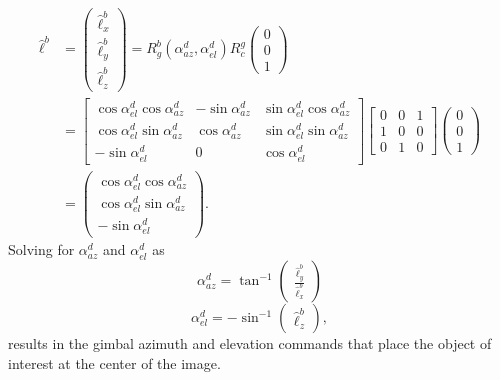 \begin{align}
\hat{\ell}^b&=\begin{pmatrix}
\hat{\ell}_x^b \\
\hat{\ell}_y^b \\
\hat{\ell}_z^b
\end{pmatrix}=R_{g}^b(\alpha_{az}^d, \alpha_{el}^d) R_{c}^g\begin{pmatrix}
0 \\ 0 \\ 1
\end{pmatrix}
\\&=\begin{bmatrix}
\cos\alpha_{el}^d\cos\alpha_{az}^d & -\sin\alpha_{az}^d & \sin\alpha_{el}^d\cos\alpha_{az}^d \\
\cos\alpha_{el}^d\sin\alpha_{az}^d & \cos\alpha_{az}^d & \sin\alpha_{el}^d\sin\alpha_{az}^d \\
-\sin\alpha_{el}^d & 0 & \cos\alpha_{el}^d
\end{bmatrix}
\begin{bmatrix}
0 & 0 & 1 \\
1 & 0 & 0 \\
0 & 1 & 0
\end{bmatrix}
\begin{pmatrix}
0 \\ 0 \\ 1
\end{pmatrix}
\\&=\begin{pmatrix}
\cos\alpha_{el}^d\cos\alpha_{az}^d \\
\cos\alpha_{el}^d\sin\alpha_{az}^d \\
-\sin\alpha_{el}^d
\end{pmatrix}.
\end{align}
Solving for $\alpha_{az}^d$ and $\alpha_{el}^d$ as 
\begin{equation}
\alpha_{az}^d=\tan^{-1}
\begin{pmatrix}
\frac{\hat{\ell}_y^b}{\hat{\ell}_x^b}
\end{pmatrix}
\end{equation}
\begin{equation}
\alpha_{el}^d=-\sin^{-1}
\begin{pmatrix}
\hat{\ell}_z^b
\end{pmatrix},
\end{equation}
results in the gimbal azimuth and elevation commands that place the object of interest at the center of the image.

